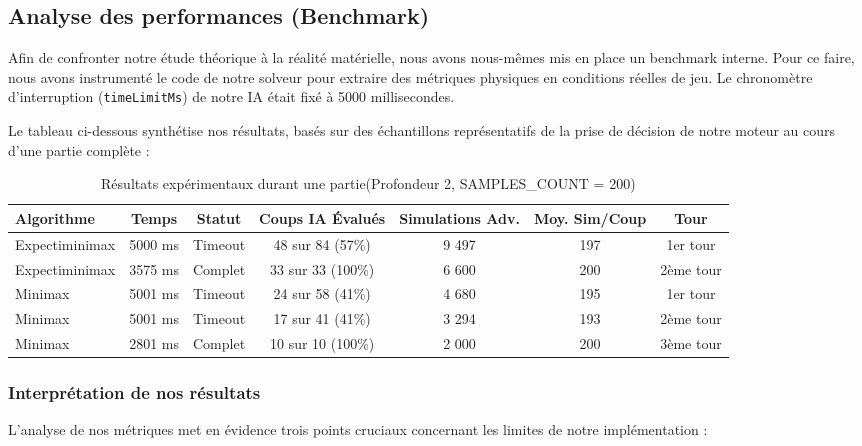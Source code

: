 \documentclass[a4paper]{article}
\begin{document}
    \subsection{Analyse des performances (Benchmark)}

    Afin de confronter notre étude théorique à la réalité matérielle, nous avons nous-mêmes mis en place un benchmark interne. Pour ce faire, nous avons instrumenté le code de notre solveur pour extraire des métriques physiques en conditions réelles de jeu. Le chronomètre d'interruption (\texttt{timeLimitMs}) de notre IA était fixé à 5000 millisecondes.

    Le tableau ci-dessous synthétise nos résultats, basés sur des échantillons représentatifs de la prise de décision de notre moteur au cours d'une partie complète :

    \begin{table}[h!]
        \centering
        \renewcommand{\arraystretch}{1.2}
        \begin{tabular}{@{}lcccccc@{}}
            \toprule
            \textbf{Algorithme} & \textbf{Temps} & \textbf{Statut} & \textbf{Coups IA Évalués} & \textbf{Simulations Adv.} & \textbf{Moy. Sim/Coup} & \textbf{Tour} \\
            \midrule
            Expectiminimax & 5000 ms & Timeout & 48 sur 84 (57\%) & 9 497 & 197 & 1er tour \\
            Expectiminimax & 3575 ms & Complet & 33 sur 33 (100\%) & 6 600 & 200 & 2ème tour \\
            Minimax        & 5001 ms & Timeout & 24 sur 58 (41\%) & 4 680 & 195 & 1er tour\\
            Minimax        & 5001 ms & Timeout & 17 sur 41 (41\%) & 3 294 & 193 & 2ème tour \\
            Minimax        & 2801 ms & Complet & 10 sur 10 (100\%) & 2 000 & 200 & 3ème tour \\
            \bottomrule
        \end{tabular}
        \caption{Résultats expérimentaux durant une partie(Profondeur 2, SAMPLES\_COUNT = 200)}
        \label{tab:metrics}
    \end{table}

    \subsubsection{Interprétation de nos résultats}

    L'analyse de nos métriques met en évidence trois points cruciaux concernant les limites de notre implémentation :
\end{document}
